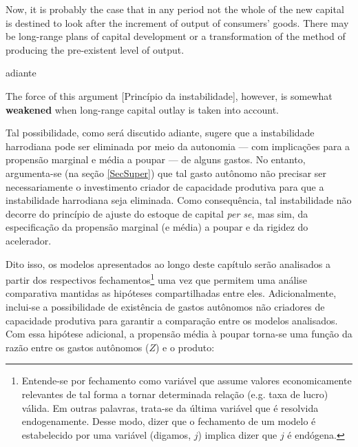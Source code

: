 \begin{citacao}
Now, it is probably the case that in any period not the whole of the new capital is destined to look after the increment of output of consumers' goods. There may be  long-range plans of capital development or a transformation  of the method of  producing  the pre-existent level of output. \cite[p.~17]{harrod_essay_1939}
\end{citacao}
adiante
\begin{citacao}
The force  of this  argument [Princípio da instabilidade], however, is somewhat \textbf{weakened} when long-range  capital outlay is taken into account.
\cite[p.~26, grifos adicionados]{harrod_essay_1939}
\end{citacao}
Tal possibilidade, como será discutido adiante, sugere que a instabilidade harrodiana pode ser eliminada por meio da autonomia --- com implicações para a propensão marginal e média a poupar ---  de alguns gastos.
No entanto, argumenta-se (na seção \ref{SecSuper}) que tal gasto autônomo não precisar ser necessariamente o investimento criador de capacidade produtiva para que a instabilidade harrodiana seja eliminada.
Como consequência, tal instabilidade não decorre do princípio de ajuste do estoque de capital \textit{per se}, mas sim, da especificação da propensão marginal (e média) a poupar e da rigidez do acelerador.

Dito isso, os modelos apresentados ao longo deste capítulo serão analisados a partir dos respectivos  fechamentos\footnote{Entende-se por fechamento como variável que assume valores economicamente relevantes de tal forma a tornar determinada relação (e.g. taxa de lucro) válida. Em outras palavras, trata-se da última variável que é resolvida endogenamente. Desse modo, dizer que o fechamento de um modelo é estabelecido por uma variável (digamos, $j$) implica dizer que $j$ é endógena.} uma vez que permitem uma análise comparativa mantidas as hipóteses compartilhadas entre eles. 
Adicionalmente, inclui-se a possibilidade de existência de gastos autônomos não criadores de capacidade produtiva para garantir a comparação entre os modelos analisados. Com essa hipótese adicional, a propensão média à poupar torna-se uma função da razão entre os gastos autônomos ($Z$) e o produto:

